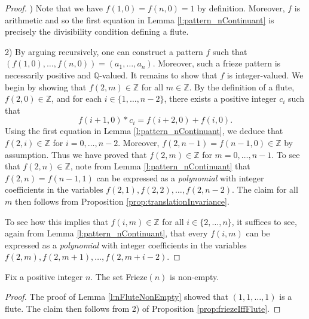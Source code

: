 \begin{proof}) Note that we have $f(1,0) = f(n,0) = 1$ by definition. Moreover, $f$ is arithmetic and so the first 
    equation in Lemma \ref{l:pattern_nContinuant} is precisely the divisibility condition defining a flute.

    2) By arguing recursively, one can construct a pattern $f$ such that $ (f (1,0), \ldots, f (n,0)) = (a_1, \ldots, a_n)$. 
    Moreover, such a frieze pattern is necessarily positive and $\mathbb{Q}$-valued. It remains to show that $f$ is integer-valued. 
    We begin by showing that $f (2,m) \in \mathbb{Z}$ for all $m \in \mathbb{Z}$. 
    By the definition of a flute, $f (2,0) \in \mathbb{Z}$, and for each 
    $i \in \{1,\ldots, n-2\}$, there exists a positive integer $c_i$ such that
    \[
        f(i+1,0) * c_i = f (i+2,0) + f (i,0).    
    \]
    Using the first equation in Lemma \ref{l:pattern_nContinuant}, we deduce that $f(2,i) \in \mathbb{Z}$ for $i =0, \ldots, n-2$. 
    Moreover, $ f (2,n-1) = f (n-1,0) \in \mathbb{Z}$ by assumption. Thus we have proved that 
    $f (2,m) \in \mathbb{Z}$ for $m = 0, \ldots, n-1$. To see that $f (2,n) \in \mathbb{Z}$, note from 
    Lemma \ref{l:pattern_nContinuant} that $f (2,n) = f (n-1,1)$ can be expressed as a {\it polynomial} with 
    integer coefficients in the variables $f (2,1), f (2,2),\ldots , f (2,n-2)$. The claim for all $m$ then follows from 
    Proposition \ref{prop:translationInvariance}. 

    To see how this implies that $f (i,m) \in \mathbb{Z}$ for all $i \in \{2, \ldots, n\}$, it suffices to 
    see, again from Lemma \ref{l:pattern_nContinuant}, that every $f (i,m)$ can be expressed as a {\it polynomial} with 
    integer coefficients in the variables $f (2,m), f (2,m+1),\ldots , f (2,m+i-2)$.

\end{proof}

\begin{corollary}
    \label{c:arithFriezePatSetNonEmpty}
    \leanok
    Fix a positive integer $n$. The set Frieze$(n)$ is non-empty.
\end{corollary}
\begin{proof}\leanok
    The proof of Lemma \ref{l:nFluteNonEmpty} showed that $(1,1,\ldots, 1)$ is a flute. 
    The claim then follows from 2) of Proposition \ref{prop:friezeIffFlute}.
\end{proof}

